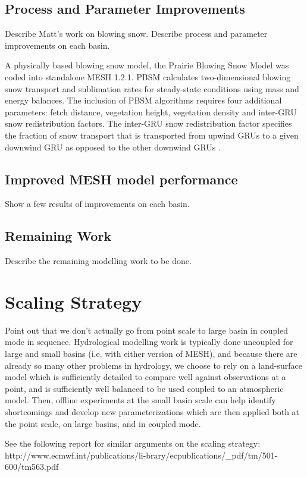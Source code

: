 \documentclass[hess]{copernicus}
\begin{document}
\subsection{Process and Parameter Improvements}
Describe Matt's work on blowing snow. Describe process and parameter improvements on each basin.

A physically based blowing snow model, the Prairie Blowing Snow Model \cite[PBSM]{pomeroy_li:2000} was coded into standalone MESH 1.2.1. PBSM calculates two-dimensional blowing snow transport and sublimation rates for steady-state conditions using mass and energy balances. The inclusion of PBSM algorithms requires four additional parameters: fetch distance, vegetation height, vegetation density and inter-GRU snow redistribution factors. The inter-GRU snow redistribution factor specifies the fraction of snow transport that is transported from upwind GRUs to a given downwind GRU as opposed to the other downwind GRUs \citep{macdonald_etal:2009}.

\subsection{Improved MESH model performance}
Show a few results of improvements on each basin.

\subsection{Remaining Work}
Describe the remaining modelling work to be done.

\section{Scaling Strategy}
Point out that we don't actually go from point scale to large basin in coupled mode in sequence. Hydrological modelling work is typically done uncoupled for large and small basins (i.e. with either version of MESH), and because there are already so many other problems in hydrology, we choose to rely on a land-surface model which is sufficiently detailed to compare well against observations at a point, and is sufficiently well balanced to be used coupled to an atmospheric model. Then, offline experiments at the small basin scale can help identify shortcomings and develop new parameterizations which are then applied both at the point scale, on large basins, and in coupled mode.

See the following report for similar arguments on the scaling strategy: http://www.ecmwf.int/publications/li-brary/ecpublications/\_pdf/tm/501-600/tm563.pdf
\end{document}
